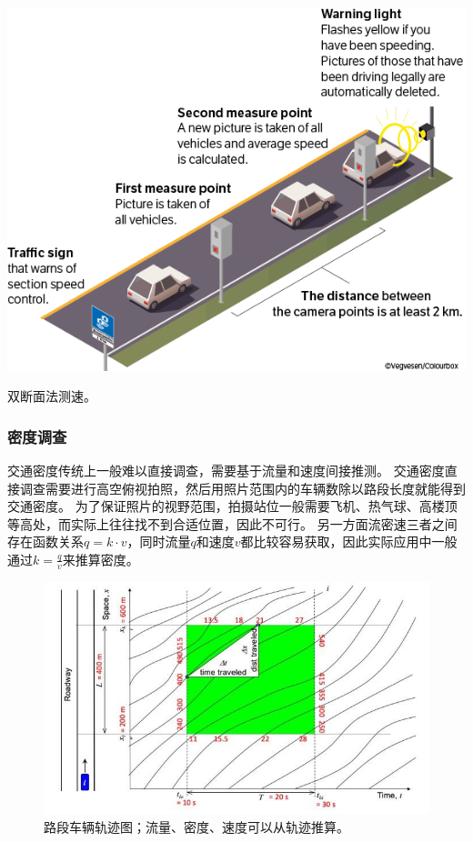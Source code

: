 \begin{marginfigure}
    \includegraphics[width=\linewidth]{images/section-speed.png}
    \caption{双断面法测速。}
    \label{fig:section-speed}
\end{marginfigure}

\subsubsection{密度调查}
交通密度传统上一般难以直接调查，需要基于流量和速度间接推测。
交通密度直接调查需要进行高空俯视拍照，然后用照片范围内的车辆数除以路段长度就能得到交通密度。
为了保证照片的视野范围，拍摄站位一般需要飞机、热气球、高楼顶等高处，而实际上往往找不到合适位置，因此不可行。
另一方面流密速三者之间存在函数关系$q=k\cdot v$，同时流量$q$和速度$v$都比较容易获取，因此实际应用中一般通过$k=\frac{q}{v}$来推算密度。

\begin{figure}
    \includegraphics[width=\linewidth]{images/flow-density-speed.jpeg}
    \caption{路段车辆轨迹图；流量、密度、速度可以从轨迹推算。}
    \label{fig:trajectory}
\end{figure}
